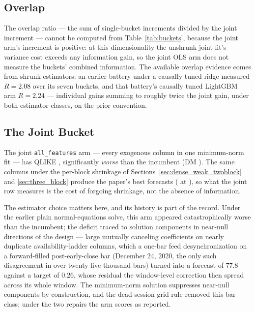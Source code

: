 \subsection{Overlap}
\label{sec:overlap}

The overlap ratio --- the sum of single-bucket increments divided by the
joint increment --- cannot be computed from Table~\ref{tab:buckets},
because the joint arm's increment is positive: at this dimensionality the
unshrunk joint fit's variance cost exceeds any information gain, so the
joint OLS arm does not measure the buckets' combined information. The
available overlap evidence comes from shrunk estimators: an earlier
battery under a causally tuned ridge measured $R = 2.08$ over its seven
buckets, and that battery's causally tuned LightGBM arm $R = 2.24$ ---
individual gains summing to roughly twice the joint gain, under both
estimator classes, on the prior convention. 

\subsection{The Joint Bucket}
\label{sec:joint_bucket}

The joint \texttt{all\_features} arm --- every exogenous column in one
minimum-norm fit --- has QLIKE \unifAllFeaturesQLIKE{}, significantly
\emph{worse} than the incumbent (DM \unifAllFeaturesDM{}). The same
columns under the per-block shrinkage of Sections~\ref{sec:dense_weak_twoblock}
and \ref{sec:three_block} produce the paper's best forecasts
(\unifBlkThreeUserQLIKE{} at \unifBlkThreeUserDM{}), so what the joint
row measures is the cost of forgoing shrinkage, not the absence of
information.

The estimator choice matters here, and its history is part of the
record. Under the earlier plain normal-equations solve, this arm appeared
catastrophically worse than the incumbent; the deficit traced to
solution components in near-null directions of the design --- large
mutually canceling coefficients on nearly duplicate availability-ladder
columns, which a one-bar feed desynchronization on a forward-filled
post-early-close bar (December 24, 2020, the only such
disagreement in over twenty-five thousand bars) turned into a forecast
of $77.8$ against a target of $0.26$, whose residual the window-level
correction then spread across its whole window. The minimum-norm
solution suppresses near-null components by construction, and the
dead-session grid rule removed this bar class; under the two
repairs the arm scores as reported.

